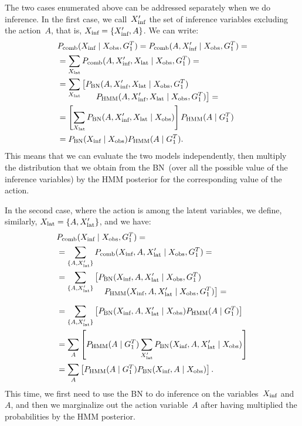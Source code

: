 The two cases enumerated above can be addressed separately when we do inference.
In the first case, we call~$X_\text{inf}^\prime$ the set of inference variables excluding the action~$A$, that is, $X_\text{inf} = \{X_\text{inf}^\prime, A\}$.
We can write:
\begin{align} \label{eq:fusion_excluding_action}
  & \pcomb(\xinf \given  \xobs, G_1^T) = \pcomb(A, \xinf^\prime \given  \xobs, G_1^T)= \nonumber \\
  &= \sum_{\xlat} \pcomb(A, \xinf^\prime, \xlat \given \xobs, G_1^T)= \nonumber\\
  &= \sum_{\xlat} \left[\pbn(A, \xinf^\prime, \xlat \given \xobs, G_1^T)\right. \nonumber \\[-4mm]
    & \mspace{80mu} \left.\phmm(A, \xinf^\prime, \xlat \given \xobs, G_1^T)\right]= \nonumber \\
  &= \left[\sum_{\xlat} \pbn(A, \xinf^\prime, \xlat \given \xobs)\right] \phmm(A \given G_1^T) \nonumber \\
  &= \pbn(\xinf \given \xobs) \phmm(A \given G_1^T).
\end{align}
This means that we can evaluate the two models independently, then multiply the distribution that we obtain from the \ac{BN}~(over all the possible value of the inference variables) by the \ac{HMM} posterior for the corresponding value of the action.

In the second case, where the action is among the latent variables, we define, similarly, $X_\text{lat} = \{A, X_\text{lat}^\prime\}$, and we have:
\begin{align} \label{eq:fusion_including_action}
  & \pcomb(\xinf \given \xobs, G_1^T) = \nonumber \\
  &= \sum_{\{A,\xlat^\prime\}} \pcomb(\xinf, A, \xlat^\prime \given \xobs, G_1^T)= \nonumber \\
  &= \sum_{\{A,\xlat^\prime\}} \left[\pbn(\xinf, A, \xlat^\prime \given \xobs, G_1^T)\right. \nonumber \\[-4mm]
    & \mspace{100mu} \left.\phmm(\xinf, A, \xlat^\prime \given \xobs, G_1^T)\right]= \nonumber \\[2mm]
  &= \sum_{\{A,\xlat^\prime\}} \left[\pbn(\xinf, A, \xlat^\prime \given \xobs) \phmm(A \given G_1^T)\right] \nonumber \\
  &= \sum_{A}\left[\phmm(A \given G_1^T)\sum_{\xlat^\prime} \pbn(\xinf, A, \xlat^\prime \given \xobs)\right] \nonumber \\
  &= \sum_{A}\left[\phmm(A \given G_1^T) \pbn(\xinf, A \given \xobs)\right].
\end{align}
This time, we first need to use the \ac{BN} to do inference on the variables~$X_\text{inf}$ and~$A$, and then we marginalize out the action variable~$A$ after having multiplied the probabilities by the \ac{HMM} posterior.

